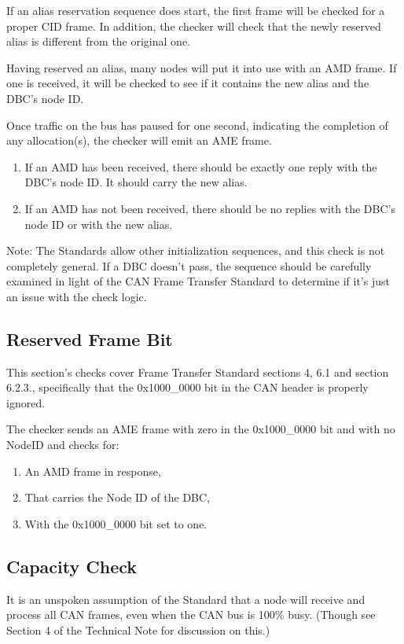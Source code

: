 If an alias reservation sequence does start, 
the first frame will be checked for a proper CID frame.  
In addition, the checker will check that the 
newly reserved alias is different from the original one.

Having reserved an alias, many nodes will put it into use with an AMD frame. 
If one is received, it will be checked to see if it contains the new alias
and the DBC's node ID.

Once traffic on the bus has paused for one second, indicating the completion of 
any allocation(s), the checker will emit an AME frame.
\begin{enumerate}
\item If an AMD has been received, there should be exactly one
        reply with the DBC's node ID.  It should carry the new alias.
\item If an AMD has not been received, there should be no 
        replies with the DBC's node ID or with the new alias.
\end{enumerate}

Note: The Standards allow other initialization sequences, and this check
is not completely general.  If a DBC doesn't pass, the sequence should
be carefully examined in light of the CAN Frame Transfer Standard
to determine if it's just an issue with the check logic.

\subsection{Reserved Frame Bit}

This section's checks cover Frame Transfer Standard sections 4, 6.1 and section 6.2.3., 
specifically that the 0x1000\_0000 bit in the CAN header is properly
ignored.

The checker sends an AME frame with zero in the 0x1000\_0000 bit
and with no NodeID and checks for:
\begin{enumerate}
\item An AMD frame in response,
\item That carries the Node ID of the DBC,
\item With the 0x1000\_0000 bit set to one.
\end{enumerate}

\subsection{Capacity Check}

It is an unspoken assumption of the Standard that a node will receive and
process all CAN frames, even when the CAN bus is 100\% busy. (Though see Section 4
of the Technical Note for discussion on this.) 

